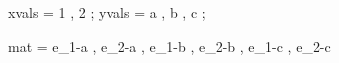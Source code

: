 xvals = 1 , 2 ;
yvals = a , b , c ;

%
mat = e_{1-a} , e_{2-a} , 
      e_{1-b} , e_{2-b} , 
      e_{1-c} , e_{2-c}
